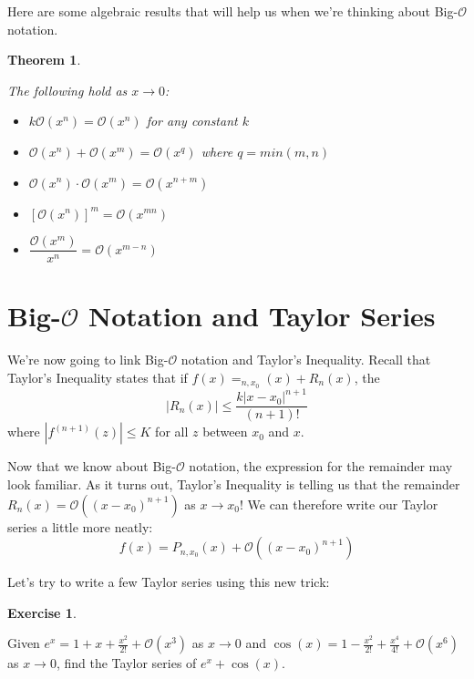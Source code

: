 \documentclass[
]{book}
\providecommand{\tightlist}{%
  \setlength{\itemsep}{0pt}\setlength{\parskip}{0pt}}
\newtheorem{theorem}{Theorem}[chapter]
\theoremstyle{definition}
\theoremstyle{definition}
\theoremstyle{definition}
\newtheorem{exercise}{Exercise}[chapter]
\theoremstyle{definition}
\theoremstyle{remark}
\begin{document}
Here are some algebraic results that will help us when we're thinking about Big-\(\mathcal{O}\) notation.

\begin{theorem}
\protect\hypertarget{thm:unlabeled-div-256}{}\label{thm:unlabeled-div-256}

The following hold as \(x\to 0\):

\begin{itemize}
\tightlist
\item
  \(k\mathcal{O}(x^n) = \mathcal{O}(x^n)\) for any constant \(k\)
\item
  \(\mathcal{O}(x^n)+\mathcal{O}(x^m) = \mathcal{O}(x^q)\) where \(q=min(m,n)\)
\item
  \(\mathcal{O}(x^n)\cdot \mathcal{O}(x^m)=\mathcal{O}(x^{n+m})\)
\item
  \([\mathcal{O}(x^n)]^m = \mathcal{O}(x^{mn})\)
\item
  \(\dfrac{\mathcal{O}(x^m)}{x^n}=\mathcal{O}(x^{m-n})\)
\end{itemize}

\end{theorem}

\hypertarget{big-mathcalo-notation-and-taylor-series}{%
\section{\texorpdfstring{Big-\(\mathcal{O}\) Notation and Taylor Series}{Big-\textbackslash mathcal\{O\} Notation and Taylor Series}}\label{big-mathcalo-notation-and-taylor-series}}

We're now going to link Big-\(\mathcal{O}\) notation and Taylor's Inequality. Recall that Taylor's Inequality states that if \(f(x)=_{n,x_0}(x)+R_n(x)\), the \[|R_n(x)| \leq \frac{k|x-x_0|^{n+1}}{(n+1)!}\] where \(|f^{(n+1)}(z)|\leq K\) for all \(z\) between \(x_0\) and \(x\).

Now that we know about Big-\(\mathcal{O}\) notation, the expression for the remainder may look familiar. As it turns out, Taylor's Inequality is telling us that the remainder \(R_n(x)=\mathcal{O}((x-x_0)^{n+1})\) as \(x\to x_0\)! We can therefore write our Taylor series a little more neatly: \[f(x)=P_{n, x_0}(x)+\mathcal{O}((x-x_0)^{n+1})\]

Let's try to write a few Taylor series using this new trick:

\begin{exercise}
\protect\hypertarget{exr:unlabeled-div-257}{}\label{exr:unlabeled-div-257}

Given \(e^x = 1+x+\frac{x^2}{2!}+\mathcal{O}(x^3)\) as \(x\to 0\) and \(\cos(x)=1-\frac{x^2}{2!}+\frac{x^4}{4!}+\mathcal{O}(x^6)\) as \(x\to 0\), find the Taylor series of
\(e^x+\cos(x)\).

\end{exercise}
\end{document}
